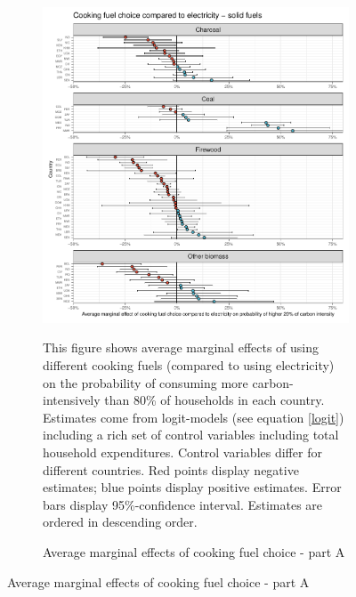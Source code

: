  \begin{figure}[ht!]\ContinuedFloat
   \centering
   \begin{subfigure}[b]{\textwidth}
   \centering
   \caption{Average marginal effects of cooking fuel choice - part A} \label{fig:Logit_ME_CF_1}
   \includegraphics{1_Figures/Analysis_Logit_Models_Marginal_Effects/Average_Marginal_Effects_affected_upper_80_CF_Electricity A_2017B.pdf}
   \begin{subcaption2}
     This figure shows average marginal effects of using different cooking fuels (compared to using electricity) on the probability of consuming more carbon-intensively than 80\% of households in each country. Estimates come from logit-models (see equation \ref{logit}) including a rich set of control variables including total household expenditures. Control variables differ for different countries. Red points display negative estimates; blue points display positive estimates. Error bars display 95\%-confidence interval. Estimates are ordered in descending order.
   \end{subcaption2}
   \end{subfigure}
 \end{figure}
 \clearpage

